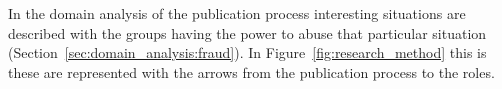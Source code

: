 \documentclass{ou-report}
\begin{document}

In the domain analysis of the 
publication process interesting situations are 
described with the groups having the power to abuse that particular situation
(Section~\ref{sec:domain_analysis:fraud}). In Figure~\ref{fig:research_method} this
is these are represented with the arrows from the publication process to the roles.
\end{document}

